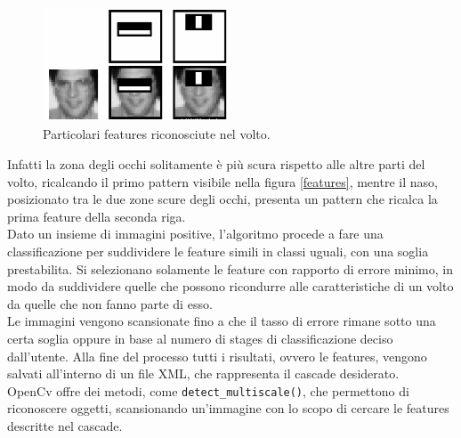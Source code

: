 \begin{itemize}
\begin{figure}%
\centering
\includegraphics[width=0.5\textwidth]{images/openCv/haar.png}
\caption{Particolari features riconosciute nel volto.\label{volti}}
\end{figure}

Infatti la zona degli occhi solitamente è più scura rispetto alle altre parti del volto, ricalcando il primo pattern visibile nella figura \ref{features}, mentre il naso, posizionato tra le due zone scure degli occhi, presenta un pattern che ricalca la prima feature della seconda riga.\\
Dato un insieme di immagini positive, l'algoritmo procede a fare una classificazione per suddividere le feature simili in classi uguali, con una soglia prestabilita. Si selezionano solamente le feature con rapporto di errore minimo, in modo da suddividere quelle che possono ricondurre alle caratteristiche di un volto da quelle che non fanno parte di esso.\\
Le immagini vengono scansionate fino a che il tasso di errore rimane sotto una certa soglia oppure in base al numero di stages di classificazione deciso dall'utente. Alla fine del processo tutti i risultati, ovvero le features, vengono salvati all'interno di un file XML, che rappresenta il cascade desiderato.\\
OpenCv offre dei metodi, come \texttt{detect\_multiscale()}, che permettono di riconoscere oggetti, scansionando un'immagine con lo scopo di cercare le features descritte nel cascade. 


\end{itemize}
\clearpage